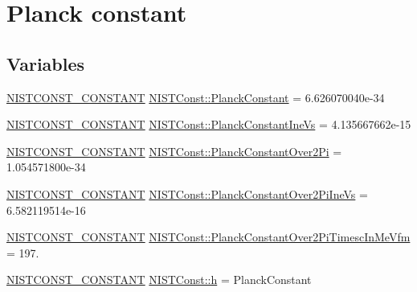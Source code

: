 \hypertarget{group___n_i_s_t_const-_planck_constant}{}\section{Planck constant}
\label{group___n_i_s_t_const-_planck_constant}
\subsection*{Variables}
\begin{DoxyCompactItemize}
\item 
\mbox{\hyperlink{group___n_i_s_t_const-_macros_ga2b0fc1d7452373f816175dd86ce26729}{N\+I\+S\+T\+C\+O\+N\+S\+T\+\_\+\+C\+O\+N\+S\+T\+A\+NT}} \mbox{\hyperlink{group___n_i_s_t_const-_planck_constant_ga469d9f8b9dfa5e6b73a460bddd16a0ed}{N\+I\+S\+T\+Const\+::\+Planck\+Constant}} = 6.\+626070040e-\/34
\item 
\mbox{\hyperlink{group___n_i_s_t_const-_macros_ga2b0fc1d7452373f816175dd86ce26729}{N\+I\+S\+T\+C\+O\+N\+S\+T\+\_\+\+C\+O\+N\+S\+T\+A\+NT}} \mbox{\hyperlink{group___n_i_s_t_const-_planck_constant_ga31cde6b55e68a183fd7c8178ac6414cc}{N\+I\+S\+T\+Const\+::\+Planck\+Constant\+Ine\+Vs}} = 4.\+135667662e-\/15
\item 
\mbox{\hyperlink{group___n_i_s_t_const-_macros_ga2b0fc1d7452373f816175dd86ce26729}{N\+I\+S\+T\+C\+O\+N\+S\+T\+\_\+\+C\+O\+N\+S\+T\+A\+NT}} \mbox{\hyperlink{group___n_i_s_t_const-_planck_constant_ga5a867434631f04938ff7d86ae9107a0b}{N\+I\+S\+T\+Const\+::\+Planck\+Constant\+Over2\+Pi}} = 1.\+054571800e-\/34
\item 
\mbox{\hyperlink{group___n_i_s_t_const-_macros_ga2b0fc1d7452373f816175dd86ce26729}{N\+I\+S\+T\+C\+O\+N\+S\+T\+\_\+\+C\+O\+N\+S\+T\+A\+NT}} \mbox{\hyperlink{group___n_i_s_t_const-_planck_constant_ga1e4fdaaf00e0741e9627e4feffccd23a}{N\+I\+S\+T\+Const\+::\+Planck\+Constant\+Over2\+Pi\+Ine\+Vs}} = 6.\+582119514e-\/16
\item 
\mbox{\hyperlink{group___n_i_s_t_const-_macros_ga2b0fc1d7452373f816175dd86ce26729}{N\+I\+S\+T\+C\+O\+N\+S\+T\+\_\+\+C\+O\+N\+S\+T\+A\+NT}} \mbox{\hyperlink{group___n_i_s_t_const-_planck_constant_ga3c5872da7678ae41641308eab4d41846}{N\+I\+S\+T\+Const\+::\+Planck\+Constant\+Over2\+Pi\+Timesc\+In\+Me\+Vfm}} = 197.
\item 
\mbox{\hyperlink{group___n_i_s_t_const-_macros_ga2b0fc1d7452373f816175dd86ce26729}{N\+I\+S\+T\+C\+O\+N\+S\+T\+\_\+\+C\+O\+N\+S\+T\+A\+NT}} \mbox{\hyperlink{group___n_i_s_t_const-_planck_constant_ga21af1e20e3f8458edb35866d476c1e2b}{N\+I\+S\+T\+Const\+::h}} = Planck\+Constant

\end{DoxyCompactItemize}
